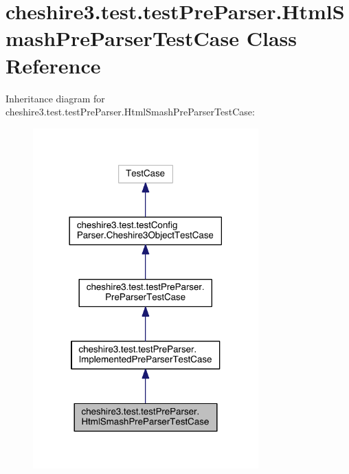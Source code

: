 \hypertarget{classcheshire3_1_1test_1_1test_pre_parser_1_1_html_smash_pre_parser_test_case}{\section{cheshire3.\-test.\-test\-Pre\-Parser.\-Html\-Smash\-Pre\-Parser\-Test\-Case Class Reference}
\label{classcheshire3_1_1test_1_1test_pre_parser_1_1_html_smash_pre_parser_test_case}
}


Inheritance diagram for cheshire3.\-test.\-test\-Pre\-Parser.\-Html\-Smash\-Pre\-Parser\-Test\-Case\-:
\nopagebreak
\begin{figure}[H]
\begin{center}
\leavevmode
\includegraphics[width=246pt]{classcheshire3_1_1test_1_1test_pre_parser_1_1_html_smash_pre_parser_test_case__inherit__graph}
\end{center}
\end{figure}


